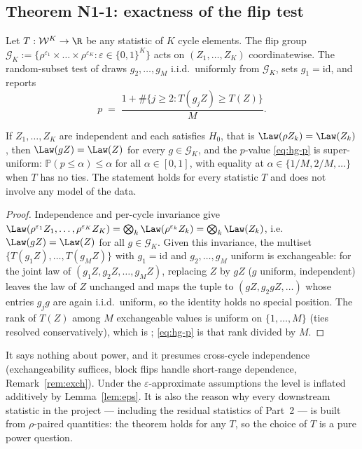 \subsection{Theorem N1-1: exactness of the flip test}
\label{sec:n1-1}

Let $T : \mathcal{W}^{K} \to \R$ be any statistic of $K$ cycle elements. The
flip group $\mathcal{G}_K := \{ \rho^{\varepsilon_1} \times \dots \times
\rho^{\varepsilon_K} : \varepsilon \in \{0,1\}^{K}\}$ acts on
$(Z_1,\dots,Z_K)$ coordinatewise. The random-subset test of
\cite{hemerik2018exact} draws $g_2,\dots,g_M$ i.i.d.\ uniformly from
$\mathcal{G}_K$, sets $g_1 = \mathrm{id}$, and reports
\begin{equation}
  \label{eq:hg-p}
  p \;=\; \frac{1 + \#\{ j \ge 2 : T(g_j Z) \ge T(Z) \}}{M}.
\end{equation}

\begin{theorem}[N1-1, exactness]
\label{thm:n1-1}
If $Z_1,\dots,Z_K$ are independent and each satisfies $H_0$, that is
$\Law(\rho Z_k) = \Law(Z_k)$, then $\Law(g Z) = \Law(Z)$ for every
$g \in \mathcal{G}_K$, and the $p$-value \eqref{eq:hg-p} is super-uniform:
$\mathbb{P}(p \le \alpha) \le \alpha$ for all $\alpha \in [0,1]$, with
equality at $\alpha \in \{1/M, 2/M, \dots\}$ when $T$ has no ties. The
statement holds for every statistic $T$ and does not involve any model of the
data.
\end{theorem}

\begin{proof}
Independence and per-cycle invariance give
$\Law(\rho^{\varepsilon_1} Z_1, \dots, \rho^{\varepsilon_K} Z_K) =
\bigotimes_k \Law(\rho^{\varepsilon_k} Z_k) = \bigotimes_k \Law(Z_k)$, i.e.\
$\Law(gZ) = \Law(Z)$ for all $g \in \mathcal{G}_K$. Given this invariance,
the multiset $\{T(g_1 Z), \dots, T(g_M Z)\}$ with $g_1 = \mathrm{id}$ and
$g_2,\dots,g_M$ uniform is exchangeable: for the joint law of
$(g_1 Z, g_2 Z, \dots, g_M Z)$, replacing $Z$ by $g Z$ ($g$ uniform,
independent) leaves the law of $Z$ unchanged and maps the tuple to
$(g Z, g_2 g Z, \dots)$ whose entries $g_j g$ are again i.i.d.\ uniform, so
the identity holds no special position. The rank of $T(Z)$ among $M$
exchangeable values is uniform on $\{1,\dots,M\}$ (ties resolved
conservatively), which is
\cite[Theorem~2]{hemerik2018exact}; \eqref{eq:hg-p} is that rank divided by
$M$.
\end{proof}

\begin{remark}
It says nothing about power, and it presumes cross-cycle independence
(exchangeability suffices, block flips handle short-range dependence,
Remark~\ref{rem:exch}). Under the $\varepsilon$-approximate assumptions the
level is inflated additively by Lemma~\ref{lem:eps}. It is also the reason
why every downstream statistic in the project --- including the residual
statistics of Part~2 --- is built from $\rho$-paired quantities: the theorem
holds for any $T$, so the choice of $T$ is a pure power question.
\end{remark}

